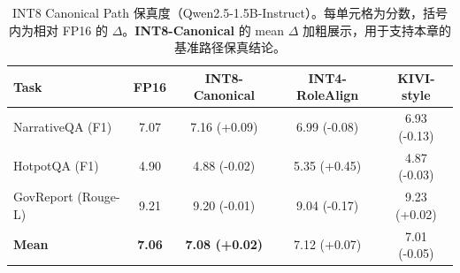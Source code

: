 \begin{table}[!htbp]
  \centering
  \small
  \begin{tabular}{lcccc}
    \toprule
    Task & FP16 & \textbf{INT8-Canonical} & INT4-RoleAlign & KIVI-style \\
    \midrule
    NarrativeQA (F1) & 7.07 & 7.16 \scriptsize{(+0.09)} & 6.99 \scriptsize{(-0.08)} & 6.93 \scriptsize{(-0.13)} \\
    HotpotQA (F1) & 4.90 & 4.88 \scriptsize{(-0.02)} & 5.35 \scriptsize{(+0.45)} & 4.87 \scriptsize{(-0.03)} \\
    GovReport (Rouge-L) & 9.21 & 9.20 \scriptsize{(-0.01)} & 9.04 \scriptsize{(-0.17)} & 9.23 \scriptsize{(+0.02)} \\
    \midrule
    \textbf{Mean} & \textbf{7.06} & \textbf{7.08 \scriptsize{(+0.02)}} & 7.12 \scriptsize{(+0.07)} & 7.01 \scriptsize{(-0.05)} \\
    \bottomrule
  \end{tabular}
  \caption{INT8 Canonical Path 保真度（Qwen2.5-1.5B-Instruct）。每单元格为分数，括号内为相对 FP16 的 $\Delta$。\textbf{INT8-Canonical} 的 mean $\Delta$ 加粗展示，用于支持本章的基准路径保真结论。}
  \label{tab:t1-int8-canonical}
  \par\smallskip{}
\end{table}
